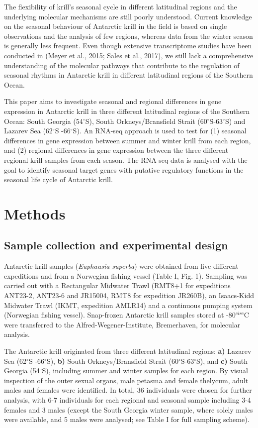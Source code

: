 The flexibility of krill's seasonal cycle in different latitudinal regions and
the underlying molecular mechanisms are still poorly understood. Current
knowledge on the seasonal behaviour of Antarctic krill in the field is based on
single observations and the analysis of few regions, whereas data from the
winter season is generally less frequent. Even though extensive transcriptome
studies have been conducted in  (Meyer et al., 2015; Sales et
al., 2017), we still lack a comprehensive understanding of the molecular
pathways that contribute to the regulation of seasonal rhythms in Antarctic
krill in different latitudinal regions of the Southern Ocean. 

This paper aims to investigate seasonal and regional differences in gene
expression in Antarctic krill in three different latitudinal regions of the
Southern Ocean: South Georgia (54$^{\circ}$S), South Orkneys/Bransfield Strait
(60$^{\circ}$S-63$^{\circ}$S) and Lazarev Sea (62$^{\circ}$S -66$^{\circ}$S). An
RNA-seq approach is used to test for (1) seasonal differences in gene
expression between summer and winter krill from each region, and (2) regional
differences in gene expression between the three different regional krill
samples from each season. The RNA-seq data is analysed with the goal to
identify seasonal target genes with putative regulatory functions in the
seasonal life cycle of Antarctic krill.

\section{Methods}

\subsection{Sample collection and experimental design}

Antarctic krill samples (\textit{Euphausia superba}) were obtained from five
different expeditions and from a Norwegian fishing vessel (Table I, Fig. 1).
Sampling was carried out with a Rectangular Midwater Trawl (RMT8+1 for
expeditions ANT23-2, ANT23-6 and JR15004, RMT8 for expedition JR260B), an
Isaacs-Kidd Midwater Trawl (IKMT, expedition AMLR14) and a continuous pumping
system (Norwegian fishing vessel). Snap-frozen Antarctic krill samples stored
at -80$^{circ}$C were transferred to the Alfred-Wegener-Institute, Bremerhaven,
for molecular analysis.

The Antarctic krill originated from three different latitudinal regions:
\textbf{a)} Lazarev Sea (62$^{\circ}$S -66$^{\circ}$S), \textbf{b)} South
Orkneys/Bransfield Strait (60$^{\circ}$S-63$^{\circ}$S), and \textbf{c)} South
Georgia (54$^{\circ}$S), including summer and winter samples for each region.
By visual inspection of the outer sexual organs, male petasma and female
thelycum, adult males and females were identified. In total, 36 individuals
were chosen for further analysis, with 6-7 individuals for each regional and
seasonal sample including 3-4 females and 3 males (except the South Georgia
winter sample, where solely males were available, and 5 males were analysed;
see Table I for full sampling scheme).

